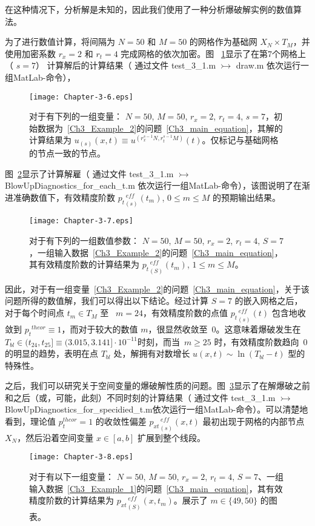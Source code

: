 \documentclass[twoside]{book}
\begin{document}
\begin{CJK*}{GBK}{song}
在这种情况下，分析解是未知的，因此我们使用了一种分析爆破解实例的数值算法。

为了进行数值计算，将间隔为 $N = 50$ 和 $M = 50$ 的网格作为基础网 $X_N \times T_M$，并使用加密系数 $r_x = 2$ 和 $r_t = 4$ 完成网格的依次加密。图 ~\ref{Fig_3_6}显示了在第7个网格上（ $s = 7$） 计算解后的计算结果（ 通过文件 test\_3\_1.m $\rightarrowtail$ draw.m 依次运行一组MatLab-命令），
\begin{figure}[t]
    \centering
    \texttt{[image: Chapter-3-6.eps]}\\
    \caption{对于有下列的一组变量： $N = 50$, $M = 50$, $r_x = 2$, $r_t = 4$, $s = 7$，初始数据为~\eqref{Ch3_Example_2}的问题~\eqref{Ch3_main_equation}，其解的计算结果为 $u_{(s)}(x,t) \equiv u^{(r_x^{s - 1}N,r_t^{s - 1}M)}(t)$。仅标记与基础网格的节点一致的节点。}
    \label{Fig_3_6}
\end{figure}

图~\ref{Fig_3_7}显示了计算解雇（ 通过文件 test\_3\_1.m $\rightarrowtail$ BlowUpDiagnostics\_for\_each\_t.m 依次运行一组MatLab-命令），该图说明了在渐进准确数值下，有效精度阶数 ${p_t}^{\, eff}_{(s)}(t_m)$, $0 \leqslant m \leqslant M$ 的预期输出结果。
\begin{figure}[t]
    \centering
    \texttt{[image: Chapter-3-7.eps]}\\
    \caption{对于有下列的一组数值参数： $N = 50$, $M = 50$, $r_x = 2$, $r_t = 4$, $S = 7$，一组输入数据~\eqref{Ch3_Example_2}的问题~\eqref{Ch3_main_equation}，其有效精度阶数的计算结果为 ${p_t}^{\, eff}_{(S)}(t_m)$, $1 \leqslant m \leqslant M$。}
    \label{Fig_3_7}
\end{figure}

因此，对于有一组变量~\eqref{Ch3_Example_2}的问题~\eqref{Ch3_main_equation}，关于该问题所得的数值解，我们可以得出以下结论。经过计算 $S = 7$ 的嵌入网格之后，对于每个时间点 $t_m \in T_M$ 至 ~$m = 24$，有效精度阶数的点值 ${p_t}^{\, eff}_{(s)}(t)$ 包含地收敛到 ${p_t}^{theor} \equiv 1$，而对于较大的数值 $m$，很显然收敛至~$0$。这意味着爆破发生在~$T_{bl} \in (t_{24},t_{25}] \equiv (3.015,3.141] \cdot 10^{-11}$时刻，而当~$m \geqslant 25$ 时，有效精度阶数趋向~$0$的明显的趋势，表明在点 $T_{bl}$ 处，解拥有对数增长 $u(x,t) \sim \ln(T_{bl} - t)$ 型的特殊性。

之后，我们可以研究关于空间变量的爆破解性质的问题。图~\ref{Fig_3_8}显示了在解爆破之前和之后（或，可能，此刻）不同时刻的计算结果（ 通过文件 test\_3\_1.m $\rightarrowtail$ BlowUpDiagnostics\_for\_specidied\_t.m依次运行一组MatLab-命令）。可以清楚地看到，理论值 $p_t^{theor} = 1$ 的收敛性偏差 ${p_{xt}}_{(s)}^{\, eff}(x,t)$ 最初出现于网格的内部节点 $X_N$，然后沿着空间变量 $x \in [a,b]$ 扩展到整个线段。
\begin{figure}[th]
    \centering
    \texttt{[image: Chapter-3-8.eps]}\\
    \caption{对于有以下一组变量： $N = 50$, $M = 50$, $r_x = 2$, $r_t = 4$, $S = 7$、一组输入数据~\eqref{Ch3_Example_1}的问题~\eqref{Ch3_main_equation}，其有效精度阶数的计算结果为 ${p_{xt}}^{\, eff}_{(S)}(x,t_m)$。展示了 $m \in \{49,50\}$ 的图表。}
    \label{Fig_3_8}
\end{figure}


\end{CJK*}
\end{document}
